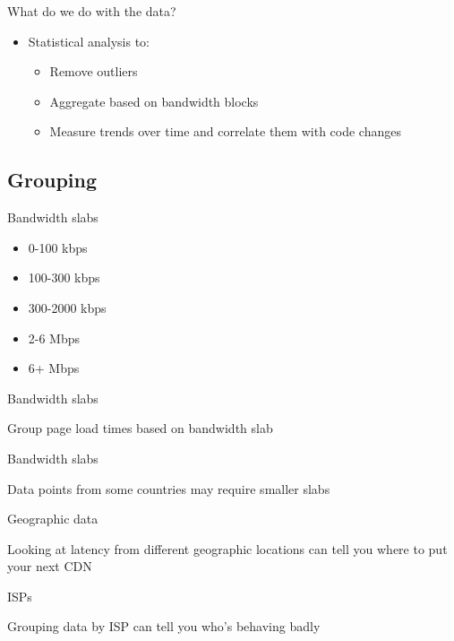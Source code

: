 \documentclass{beamer}
\begin{document}
\begin{frame}{What do we do with the data?}
  \begin{itemize}
  \item Statistical analysis to:
    \begin{itemize}
    \item Remove outliers
    \item Aggregate based on bandwidth blocks
    \item Measure trends over time and correlate them with code changes
    \end{itemize}
  \end{itemize}
\end{frame}

\subsection{Grouping}

\begin{frame}{Bandwidth slabs}
  \begin{itemize}
  \item 0-100 kbps
  \item 100-300 kbps
  \item 300-2000 kbps
  \item 2-6 Mbps
  \item 6+ Mbps
  \end{itemize}
\end{frame}

\begin{frame}{Bandwidth slabs}
  \begin{center}
  Group page load times based on bandwidth slab
  \end{center}
\end{frame}

\begin{frame}{Bandwidth slabs}
  \begin{center}
  Data points from some countries may require smaller slabs
  \end{center}
\end{frame}

\begin{frame}{Geographic data}
  \begin{center}
  Looking at latency from different geographic locations can tell you where to put your next CDN
  \end{center}
\end{frame}

\begin{frame}{ISPs}
  \begin{center}
  Grouping data by ISP can tell you who's behaving badly
  \end{center}
\end{frame}
\end{document}
